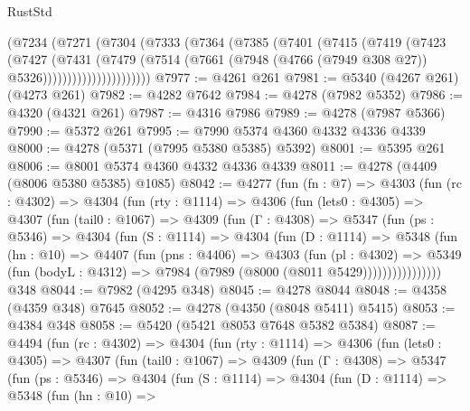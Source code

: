 \begin{lexlean}{RustStd}
\begin{coremodule}
                (@7234
                  (@7271
                    (@7304
                      (@7333
                        (@7364
                          (@7385
                            (@7401
                              (@7415
                                (@7419
                                  (@7423
                                    (@7427
                                      (@7431
                                        (@7479
                                          (@7514
                                            (@7661
                                              (@7948
                                                (@4766 (@7949 @308 @27))
                                                @5326))))))))))))))))))))))
@7977 := @4261 @261
@7981 := @5340 (@4267 @261) (@4273 @261)
@7982 := @4282 @7642
@7984 := @4278 (@7982 @5352)
@7986 := @4320 (@4321 @261)
@7987 := @4316 @7986
@7989 := @4278 (@7987 @5366)
@7990 := @5372 @261
@7995 := @7990 @5374 @4360 @4332 @4336 @4339
@8000 := @4278 (@5371 (@7995 @5380 @5385) @5392)
@8001 := @5395 @261
@8006 := @8001 @5374 @4360 @4332 @4336 @4339
@8011 := @4278 (@4409 (@8006 @5380 @5385) @1085)
@8042 := @4277
    (fun (fn : @7) =>
    @4303
      (fun (rc : @4302) =>
      @4304
        (fun (rty : @1114) =>
        @4306
          (fun (lets0 : @4305) =>
          @4307
            (fun (tail0 : @1067) =>
            @4309
              (fun (Γ : @4308) =>
              @5347
                (fun (ps : @5346) =>
                @4304
                  (fun (S : @1114) =>
                  @4304
                    (fun (D : @1114) =>
                    @5348
                      (fun (hn : @10) =>
                      @4407
                        (fun (pns : @4406) =>
                        @4303
                          (fun (pl : @4302) =>
                          @5349
                            (fun (bodyL : @4312) => @7984 (@7989 (@8000 (@8011 @5429))))))))))))))))
    @348
@8044 := @7982 (@4295 @348)
@8045 := @4278 @8044
@8048 := @4358 (@4359 @348) @7645
@8052 := @4278 (@4350 (@8048 @5411) @5415)
@8053 := @4384 @348
@8058 := @5420 (@5421 @8053 @7648 @5382 @5384)
@8087 := @4494
    (fun (rc : @4302) =>
    @4304
      (fun (rty : @1114) =>
      @4306
        (fun (lets0 : @4305) =>
        @4307
          (fun (tail0 : @1067) =>
          @4309
            (fun (Γ : @4308) =>
            @5347
              (fun (ps : @5346) =>
              @4304
                (fun (S : @1114) =>
                @4304
                  (fun (D : @1114) =>
                  @5348
                    (fun (hn : @10) =>

\end{coremodule}
\end{lexlean}
